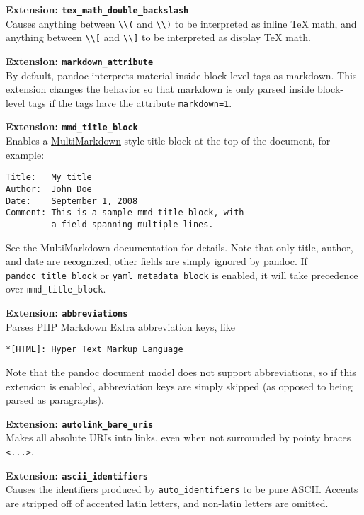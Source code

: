 \documentclass[]{article}
\begin{document}
\textbf{Extension: \texttt{tex\_math\_double\_backslash}}\\Causes
anything between \texttt{\textbackslash{}\textbackslash{}(} and
\texttt{\textbackslash{}\textbackslash{})} to be interpreted as inline
TeX math, and anything between
\texttt{\textbackslash{}\textbackslash{}{[}} and
\texttt{\textbackslash{}\textbackslash{}{]}} to be interpreted as
display TeX math.

\textbf{Extension: \texttt{markdown\_attribute}}\\By default, pandoc
interprets material inside block-level tags as markdown. This extension
changes the behavior so that markdown is only parsed inside block-level
tags if the tags have the attribute \texttt{markdown=1}.

\textbf{Extension: \texttt{mmd\_title\_block}}\\Enables a
\href{http://fletcherpenney.net/multimarkdown/}{MultiMarkdown} style
title block at the top of the document, for example:

\begin{verbatim}
Title:   My title
Author:  John Doe
Date:    September 1, 2008
Comment: This is a sample mmd title block, with
         a field spanning multiple lines.
\end{verbatim}

See the MultiMarkdown documentation for details. Note that only title,
author, and date are recognized; other fields are simply ignored by
pandoc. If \texttt{pandoc\_title\_block} or
\texttt{yaml\_metadata\_block} is enabled, it will take precedence over
\texttt{mmd\_title\_block}.

\textbf{Extension: \texttt{abbreviations}}\\Parses PHP Markdown Extra
abbreviation keys, like

\begin{verbatim}
*[HTML]: Hyper Text Markup Language
\end{verbatim}

Note that the pandoc document model does not support abbreviations, so
if this extension is enabled, abbreviation keys are simply skipped (as
opposed to being parsed as paragraphs).

\textbf{Extension: \texttt{autolink\_bare\_uris}}\\Makes all absolute
URIs into links, even when not surrounded by pointy braces
\texttt{\textless{}...\textgreater{}}.

\textbf{Extension: \texttt{ascii\_identifiers}}\\Causes the identifiers
produced by \texttt{auto\_identifiers} to be pure ASCII. Accents are
stripped off of accented latin letters, and non-latin letters are
omitted.
\end{document}
